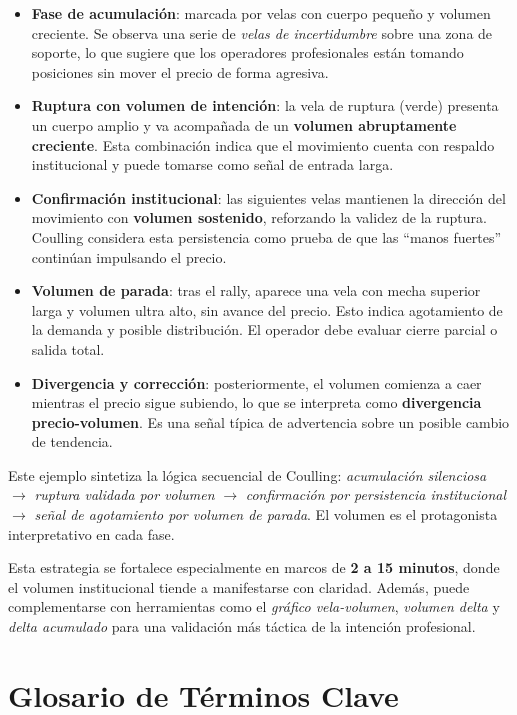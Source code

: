 \begin{itemize}
  \item \textbf{Fase de acumulaci\'on}: marcada por velas con cuerpo peque\~no y volumen creciente. Se observa una serie de \textit{velas de incertidumbre} sobre una zona de soporte, lo que sugiere que los operadores profesionales est\'an tomando posiciones sin mover el precio de forma agresiva. 
  \item \textbf{Ruptura con volumen de intenci\'on}: la vela de ruptura (verde) presenta un cuerpo amplio y va acompa\~nada de un \textbf{volumen abruptamente creciente}. Esta combinaci\'on indica que el movimiento cuenta con respaldo institucional y puede tomarse como se\~nal de entrada larga.
  \item \textbf{Confirmaci\'on institucional}: las siguientes velas mantienen la direcci\'on del movimiento con \textbf{volumen sostenido}, reforzando la validez de la ruptura. Coulling considera esta persistencia como prueba de que las ``manos fuertes'' contin\'uan impulsando el precio.
  \item \textbf{Volumen de parada}: tras el rally, aparece una vela con mecha superior larga y volumen ultra alto, sin avance del precio. Esto indica agotamiento de la demanda y posible distribuci\'on. El operador debe evaluar cierre parcial o salida total.
  \item \textbf{Divergencia y correcci\'on}: posteriormente, el volumen comienza a caer mientras el precio sigue subiendo, lo que se interpreta como \textbf{divergencia precio-volumen}. Es una se\~nal t\'ipica de advertencia sobre un posible cambio de tendencia.
\end{itemize}

\noindent
Este ejemplo sintetiza la l\'ogica secuencial de Coulling: \textit{acumulaci\'on silenciosa} $\rightarrow$ \textit{ruptura validada por volumen} $\rightarrow$ \textit{confirmaci\'on por persistencia institucional} $\rightarrow$ \textit{se\~nal de agotamiento por volumen de parada}. El volumen es el protagonista interpretativo en cada fase.

\noindent
Esta estrategia se fortalece especialmente en marcos de \textbf{2 a 15 minutos}, donde el volumen institucional tiende a manifestarse con claridad. Además, puede complementarse con herramientas como el \textit{gráfico vela-volumen}, \textit{volumen delta} y \textit{delta acumulado} para una validación más táctica de la intención profesional.


\section*{Glosario de T\'erminos Clave}

